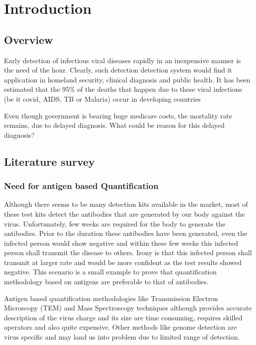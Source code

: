 \documentclass{FR16}
\begin{document}
\maketitle

\tableofcontents
\newpage

\section{Introduction}

\subsection{Overview}
Early detection of infectious viral diseases rapidly in an inexpensive manner is the need of the hour. Clearly, such detection detection system would find it application in homeland security, clinical diagnosis and public health. It has been estimated that the 95\% of the deaths that happen due to these viral infections (be it covid, AIDS, TB or Malaria) occur in developing countries

Even though government is bearing huge medicare costs, the mortality rate remains, due  to delayed diagnosis. What could be reason for this delayed diagnosis?

\subsection{Literature survey}

\subsubsection{Need for antigen based Quantification }
Although there seems to be many detection kits available in the market, most of these test kits detect the antibodies that are generated by our body against the virus. Unfortunately, few weeks are required for  the body to generate the antibodies. Prior to the duration these antibodies have been generated, even the infected person would show negative and within these few weeks this infected person shall transmit the disease to others. Irony is that this infected person shall transmit at larger rate and would be more confident as the test results showed negative. This scenario is a small example to prove that quantification methodology based on antigens are preferable to that of antibodies.

Antigen based quantification methodologies like  Transmission Electron Microscopy (TEM) and Mass Spectroscopy techniques although provides accurate description of the virus charge and its size are time consuming, requires skilled operators  and also quite expensive. Other methods like genome detection are virus specific and may land us into problem due to limited range of detection.
\end{document}
